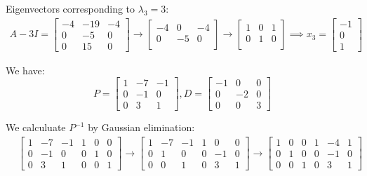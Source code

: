 \documentclass{article}
\begin{document}
Eigenvectors corresponding to $\lambda_3=3$:
\begin{align*}
    A-3I
	=\begin{bmatrix}
		-4 & -19 & -4 \\
		0 & -5 & 0 \\
		0 & 15 & 0
	\end{bmatrix}
	\rightarrow\begin{bmatrix}
		-4 & 0 & -4 \\
		0 & -5 & 0 \\
	\end{bmatrix}
	\rightarrow\begin{bmatrix}
		1 & 0 & 1 \\
		0 & 1 & 0 \\
	\end{bmatrix}
	\implies x_3=\begin{bmatrix}
		-1 \\ 0 \\ 1
	\end{bmatrix}
\end{align*}

We have:
\begin{equation*}
    P=\begin{bmatrix}
		1 & -7 & -1 \\
		0 & -1 & 0 \\
		0 & 3 & 1
    \end{bmatrix}, 
	D=\begin{bmatrix}
		-1 & 0 & 0 \\
		0 & -2 & 0 \\
		0 & 0 & 3
	\end{bmatrix}
\end{equation*}

We calculuate $P^{-1}$ by Gaussian elimination:
\begin{align*}
	&{}
	\left[ \begin{array}{ccc|ccc}
		1 & -7 & -1 & 1 & 0 & 0 \\
		0 & -1 & 0 & 0 & 1 & 0 \\
		0 & 3 & 1 & 0 & 0 & 1
	\end{array} \right]
	\rightarrow \left[ \begin{array}{ccc|ccc}
		1 & -7 & -1 & 1 & 0 & 0 \\
		0 & 1 & 0 & 0 & -1 & 0 \\
		0 & 0 & 1 & 0 & 3 & 1
	\end{array} \right]
	\rightarrow \left[ \begin{array}{ccc|ccc}
		1 & 0 & 0 & 1 & -4 & 1 \\
		0 & 1 & 0 & 0 & -1 & 0 \\
		0 & 0 & 1 & 0 & 3 & 1
	\end{array} \right]
\end{align*}
\end{document}
